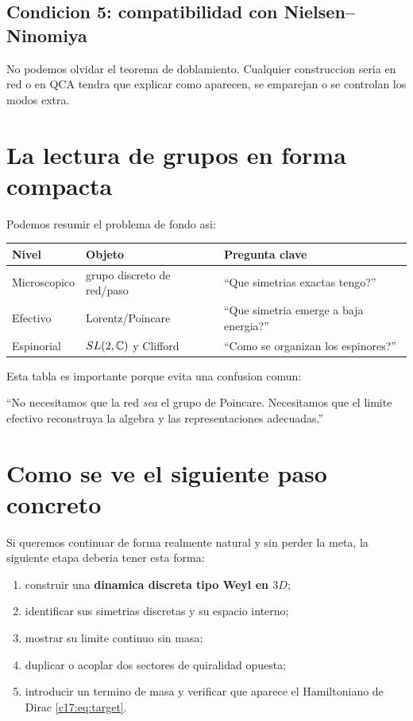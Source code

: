 \subsection{Condicion 5: compatibilidad con Nielsen--Ninomiya}

No podemos olvidar el teorema de doblamiento. Cualquier construccion seria en red o en QCA tendra que explicar como aparecen, se emparejan o se controlan los modos extra.

\section{La lectura de grupos en forma compacta}

Podemos resumir el problema de fondo asi:

\begin{center}
\begin{tabular}{@{}lll@{}}
\toprule
Nivel & Objeto & Pregunta clave \\
\midrule
Microscopico & grupo discreto de red/paso & \enquote{Que simetrias exactas tengo?} \\
Efectivo & Lorentz/Poincare & \enquote{Que simetria emerge a baja energia?} \\
Espinorial & \(SL(2,\mathbb{C})\) y Clifford & \enquote{Como se organizan los espinores?} \\
\bottomrule
\end{tabular}
\end{center}

Esta tabla es importante porque evita una confusion comun:

\begin{displayquote}
\enquote{No necesitamos que la red \emph{sea} el grupo de Poincare. Necesitamos que el limite efectivo reconstruya la algebra y las representaciones adecuadas.}
\end{displayquote}

\section{Como se ve el siguiente paso concreto}

Si queremos continuar de forma realmente natural y sin perder la meta, la siguiente etapa deberia tener esta forma:

\begin{enumerate}[leftmargin=*]
  \item construir una \textbf{dinamica discreta tipo Weyl en \(3D\)};
  \item identificar sus simetrias discretas y su espacio interno;
  \item mostrar su limite continuo sin masa;
  \item duplicar o acoplar dos sectores de quiralidad opuesta;
  \item introducir un termino de masa y verificar que aparece el Hamiltoniano de Dirac \eqref{c17:eq:target}.
\end{enumerate}

